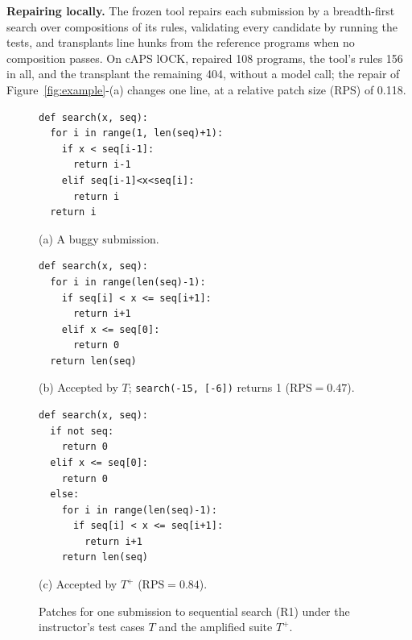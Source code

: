 \documentclass[acmsmall,screen,review,anonymous,nonacm]{acmart}
\newcommand{\RPS}{\mathrm{RPS}}
\begin{document}
\textbf{Repairing locally.} The frozen tool repairs each submission by a breadth-first search over compositions of its rules, validating every candidate by running the tests, and transplants line hunks from the reference programs when no composition passes. On cAPS lOCK,  repaired 108 programs, the tool's rules 156 in all, and the transplant the remaining 404, without a model call; the repair of Figure~\ref{fig:example}-(a) changes one line, at a relative patch size (RPS) of 0.118.

\begin{figure}[t]
\centering
\begin{minipage}[t]{0.31\textwidth}
\begin{lstlisting}
def search(x, seq):
  for i in range(1, len(seq)+1):
    if x < seq[i-1]:
      return i-1
    elif seq[i-1]<x<seq[i]:
      return i
  return i
\end{lstlisting}
\centering\footnotesize (a) A buggy submission.
\end{minipage}\hfill
\begin{minipage}[t]{0.31\textwidth}
\begin{lstlisting}
def search(x, seq):
  for i in range(len(seq)-1):
    if seq[i] < x <= seq[i+1]:
      return i+1
    elif x <= seq[0]:
      return 0
  return len(seq)
\end{lstlisting}
\centering\footnotesize (b) Accepted by $T$; \texttt{search(-15, [-6])} returns 1 ($\RPS = 0.47$).
\end{minipage}\hfill
\begin{minipage}[t]{0.33\textwidth}
\begin{lstlisting}
def search(x, seq):
  if not seq:
    return 0
  elif x <= seq[0]:
    return 0
  else:
    for i in range(len(seq)-1):
      if seq[i] < x <= seq[i+1]:
        return i+1
    return len(seq)
\end{lstlisting}
\centering\footnotesize (c) Accepted by $T^{+}$ ($\RPS = 0.84$).
\end{minipage}
\caption{Patches for one submission to sequential search (R1) under the instructor's test cases $T$ and the amplified suite $T^{+}$.}
\label{fig:thin}
\end{figure}
\end{document}
